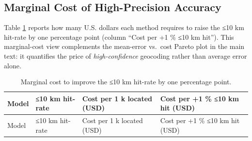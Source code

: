 \subsection{Marginal Cost of High-Precision
Accuracy}\label{c.3-marginal-cost-of-high-precision-accuracy}

Table \ref{tbl:cost_marginal} reports how many U.S. dollars each method
requires to raise the ≤10 km hit-rate by one percentage point (column
``Cost per +1 \% ≤10 km hit''). This marginal-cost view complements the
mean-error vs.~cost Pareto plot in the main text: it quantifies the
price of \emph{high-confidence} geocoding rather than average error
alone.

\begin{longtable}[]{@{}
  >{\raggedright\arraybackslash}p{}
  >{\raggedright\arraybackslash}p{}
  >{\raggedright\arraybackslash}p{}
  >{\raggedright\arraybackslash}p{}@{}}
\caption{\label{tbl:cost_marginal}Marginal cost to improve the ≤10 km
hit-rate by one percentage point.}\tabularnewline
\toprule\noalign{}
\begin{minipage}[b]{\linewidth}\raggedright
Model
\end{minipage} & \begin{minipage}[b]{\linewidth}\raggedright
≤10 km hit-rate
\end{minipage} & \begin{minipage}[b]{\linewidth}\raggedright
Cost per 1 k located (USD)
\end{minipage} & \begin{minipage}[b]{\linewidth}\raggedright
Cost per +1 \% ≤10 km hit (USD)
\end{minipage} \\
\midrule\noalign{}
\endfirsthead
\toprule\noalign{}
\begin{minipage}[b]{\linewidth}\raggedright
Model
\end{minipage} & \begin{minipage}[b]{\linewidth}\raggedright
≤10 km hit-rate
\end{minipage} & \begin{minipage}[b]{\linewidth}\raggedright
Cost per 1 k located (USD)
\end{minipage} & \begin{minipage}[b]{\linewidth}\raggedright
Cost per +1 \% ≤10 km hit (USD)
\end{minipage} \\

\end{longtable}

